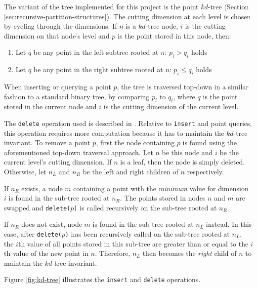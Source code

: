 The variant of the tree implemented for this project is the point $kd$-tree (Section \ref{sec:recursive-partition-structures}). The cutting dimension at each level is chosen by cycling through the dimensions. If $n$ is a $kd$-tree node, $i$ is the cutting dimension on that node's level and $p$ is the point stored in this node, then:
\begin{enumerate}
	\item Let $q$ be any point in the left subtree rooted at $n$: $p_i > q_i$ holds
	\item Let $q$ be any point in the right subtree rooted at $n$: $p_i \leq q_i$ holds
\end{enumerate}
When inserting or querying a point $p$, the tree is traversed top-down in a similar fashion to a standard binary tree, by comparing $p_i$ to $q_i$, where $q$ is the point stored in the current node and $i$ is the cutting dimension of the current level.

The \texttt{delete} operation used is described in \cite{kdtree-remove}. Relative to \texttt{insert} and point queries, this operation requires more computation because it has to maintain the $kd$-tree invariant. To remove a point $p$, first the node containing $p$ is found using the aforementioned top-down traversal approach. Let $n$ be this node and $i$ be the current level's cutting dimension. If $n$ is a leaf, then the node is simply deleted. Otherwise, let $n_L$ and $n_R$ be the left and right children of $n$ respectively. 

If $n_R$ exists, a node $m$ containing a point with the \textit{minimum} value for dimension $i$ is found in the sub-tree rooted at $n_R$. The points stored in nodes $n$ and $m$ are swapped and \texttt{delete($p$)} is called recursively on the sub-tree rooted at $n_R$.

If $n_R$ does not exist, node $m$ is found in the sub-tree rooted at $n_L$ instead. In this case, after \texttt{delete($p$)} has been recursively called on the sub-tree rooted at $n_L$, the $i$th value of all points stored in this sub-tree are greater than or equal to the $i$th value of the new point in $n$. Therefore, $n_L$ then becomes the \textit{right} child of $n$ to maintain the $kd$-tree invariant. 

Figure \ref{fig:kd-tree} illustrates the \texttt{insert} and \texttt{delete} operations.

